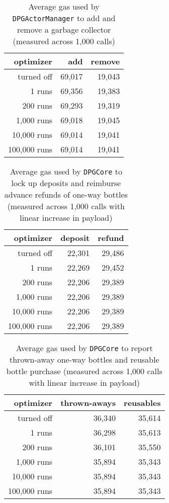 \begin{appendices}
\begin{table}[hbt]
	\centering	
	\begin{tabular}{r|r|r}
    	optimizer & add & remove \\
    	\hline
    	turned off & 69,017 & 19,043 \\
    	1 runs & 69,356 & 19,383 \\ 
    	200 runs & 69,293 & 19,319 \\
    	1,000 runs & 69,018 & 19,045 \\ 
    	10,000 runs & 69,014 & 19,041 \\
    	100,000 runs & 69,014 & 19,041 \\
	\end{tabular}
	\caption[Average gas used to add and remove a garbage collector]{Average gas used by \texttt{DPGActorManager} to add and remove a garbage collector (measured across 1,000 calls)}
	\label{tab:collectorGas}
\end{table}

\begin{table}[hbt]
	\centering	
	\begin{tabular}{r|r|r}
    	optimizer & deposit & refund \\
    	\hline
    	turned off & 22,301 & 29,486 \\
    	1 runs & 22,269 & 29,452 \\ 
    	200 runs & 22,206 & 29,389 \\
    	1,000 runs & 22,206 & 29,389 \\ 
    	10,000 runs & 22,206 & 29,389 \\
    	100,000 runs & 22,206 & 29,389 \\
	\end{tabular}
	\caption[Average gas used to lock up deposits and reimburse advance refunds of one-way bottles]{Average gas used by \texttt{DPGCore} to lock up deposits and reimburse advance refunds of one-way bottles (measured across 1,000 calls with linear increase in payload)}
	\label{tab:depositRefundGas}
\end{table}

\begin{table}[hbt]
	\centering	
	\begin{tabular}{r|r|r}
    	optimizer & thrown-aways & reusables \\
    	\hline
    	turned off & 36,340 & 35,614 \\
    	1 runs & 36,298 & 35,613 \\ 
    	200 runs & 36,101 & 35,550 \\
    	1,000 runs & 35,894 & 35,343 \\ 
    	10,000 runs & 35,894 & 35,343 \\
    	100,000 runs & 35,894 & 35,343 \\
	\end{tabular}
	\caption[Average gas used to report thrown-away one-way bottles and reusable bottle purchases]{Average gas used by \texttt{DPGCore} to report thrown-away one-way bottles and reusable bottle purchase (measured across 1,000 calls with linear increase in payload)}
	\label{tab:reportGas}
\end{table}


\end{appendices}
